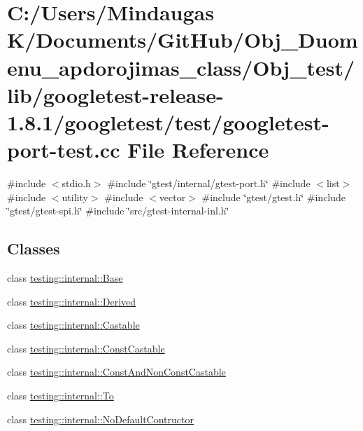 \hypertarget{_obj__test_2lib_2googletest-release-1_88_81_2googletest_2test_2googletest-port-test_8cc}{}\section{C\+:/\+Users/\+Mindaugas K/\+Documents/\+Git\+Hub/\+Obj\+\_\+\+Duomenu\+\_\+apdorojimas\+\_\+class/\+Obj\+\_\+test/lib/googletest-\/release-\/1.8.1/googletest/test/googletest-\/port-\/test.cc File Reference}
\label{_obj__test_2lib_2googletest-release-1_88_81_2googletest_2test_2googletest-port-test_8cc}
{\ttfamily \#include $<$stdio.\+h$>$}\newline
{\ttfamily \#include \char`\"{}gtest/internal/gtest-\/port.\+h\char`\"{}}\newline
{\ttfamily \#include $<$list$>$}\newline
{\ttfamily \#include $<$utility$>$}\newline
{\ttfamily \#include $<$vector$>$}\newline
{\ttfamily \#include \char`\"{}gtest/gtest.\+h\char`\"{}}\newline
{\ttfamily \#include \char`\"{}gtest/gtest-\/spi.\+h\char`\"{}}\newline
{\ttfamily \#include \char`\"{}src/gtest-\/internal-\/inl.\+h\char`\"{}}\newline
\subsection*{Classes}
\begin{DoxyCompactItemize}
\item 
class \mbox{\hyperlink{classtesting_1_1internal_1_1_base}{testing\+::internal\+::\+Base}}
\item 
class \mbox{\hyperlink{classtesting_1_1internal_1_1_derived}{testing\+::internal\+::\+Derived}}
\item 
class \mbox{\hyperlink{classtesting_1_1internal_1_1_castable}{testing\+::internal\+::\+Castable}}
\item 
class \mbox{\hyperlink{classtesting_1_1internal_1_1_const_castable}{testing\+::internal\+::\+Const\+Castable}}
\item 
class \mbox{\hyperlink{classtesting_1_1internal_1_1_const_and_non_const_castable}{testing\+::internal\+::\+Const\+And\+Non\+Const\+Castable}}
\item 
class \mbox{\hyperlink{classtesting_1_1internal_1_1_to}{testing\+::internal\+::\+To}}
\item 
class \mbox{\hyperlink{classtesting_1_1internal_1_1_no_default_contructor}{testing\+::internal\+::\+No\+Default\+Contructor}}
\end{DoxyCompactItemize}

